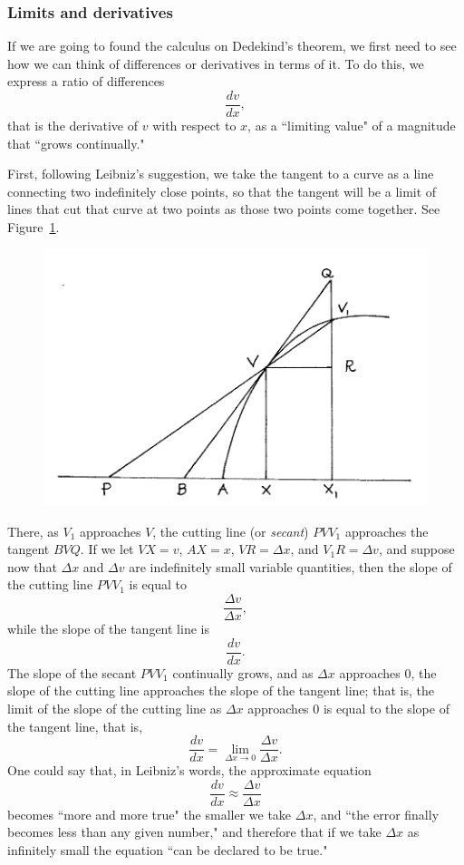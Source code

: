 \documentclass[polutonikogreek,english,twoside,openright]{article}
\begin{document}
\subsubsection*{Limits and derivatives}

If we are going to found the calculus on Dedekind's theorem, we first
need to see how we can think of differences or derivatives in terms of
it.  To do this, we express a ratio of differences
$$\frac{dv}{dx},$$
that is the derivative of $v$ with respect to $x$, as a ``limiting
value" of a magnitude that ``grows continually."

First, following Leibniz's suggestion, we take the tangent to a curve
as a line connecting two indefinitely close points, so that the
tangent will be a limit of lines that cut that curve at two points as
those two points come together.  See Figure~\ref{limitfig}.
\begin{figure}[htp]
  \begin{center}
    \includegraphics[width=.65\textwidth]{fig/Figure79}
    \caption{}
    \label{limitfig}
    \vspace{-10pt}
  \end{center}
\end{figure} There, as $V_1$ approaches $V$, the cutting line (or {\em
  secant}) $PVV_1$ approaches the tangent $BVQ$.  If we let $VX=v$,
$AX=x$, $VR =\Delta x$, and $V_1R = \Delta v$, and suppose now that
$\Delta x$ and $\Delta v$ are indefinitely small variable quantities,
then the slope of the cutting line $PVV_1$ is equal to
$$ \frac{\Delta v}{\Delta x},$$
while the slope of the tangent line is 
$$\frac{dv}{dx}.$$
The slope of the secant $PVV_1$ continually grows, and as $\Delta x$
approaches 0, the slope of the cutting line approaches the slope of
the tangent line; that is, the limit of the slope of the cutting line
as $\Delta x$ approaches 0 is equal to the slope of the tangent line,
that is,
$$\frac{dv}{dx} = \lim_{\Delta x \rightarrow 0}\frac{\Delta v}{\Delta x}.$$
One could say that, in Leibniz's words, the approximate equation
$$\frac{dv}{dx} \approx \frac{\Delta v}{\Delta x}$$
becomes ``more and more true" the smaller we take $\Delta x$, and
``the error finally becomes less than any given number," and therefore
that if we take $\Delta x$ as infinitely small the equation ``can be
declared to be true."
\end{document}
